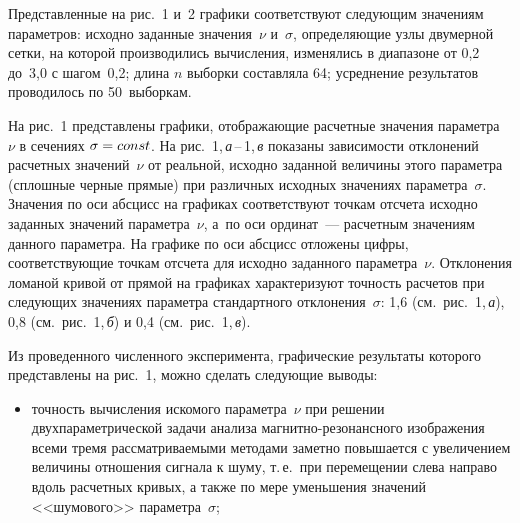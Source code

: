 \begin{multicols}{2}
    Представленные на рис.~1 и~2 графики соответствуют следующим значениям
параметров: исходно заданные значения~$\nu$ и~$\sigma$, определяющие узлы
двумерной сетки, на которой производились вычисления, изменялись в диапазоне от 0,2
до~3,0 с шагом~0,2; длина $n$ выборки составляла 64; усреднение результатов
проводилось по 50~выборкам.

    На рис.~1 представлены графики, отобра\-жа\-ющие расчетные значения
параметра~$\nu$ в сечениях $\sigma\hm=const$.
На рис.~1,\,\textit{а}\,--\,1,\,\textit{в}
показаны зависимости отклонений расчетных значений~$\nu$  от реальной, исходно
заданной величины этого параметра (сплошные черные прямые)
при различных исходных значениях
параметра~$\sigma$. Значения по оси абсцисс на\linebreak
графиках соответствуют точкам отсчета
исходно \mbox{заданных} значений параметра~$\nu$, а~по оси ординат~--- расчетным значениям
данного параметра. %
На графике
по оси абсцисс отложены цифры, соответствующие точкам отсчета для исходно заданного
параметра~$\nu$. Отклонения ломаной кривой от прямой на графиках характеризуют точность
расчетов при следующих значениях параметра стандартного отклонения~$\sigma$:
1,6 (см.\ рис.~1,\,\textit{а}), 0,8 (см.\ рис.~1,\,\textit{б})
и 0,4 (см.\ рис.~1,\,\textit{в}).

    Из проведенного численного эксперимента, графические результаты которого
представлены на рис.~1, можно сделать следующие выводы:
    \begin{itemize} %
    \item  точность вычисления искомого параметра~$\nu$ при решении
двухпараметрической задачи анализа маг\-нит\-но-ре\-зо\-нансно\-го изображения всеми
тремя рассматриваемыми методами заметно повышается с увеличением величины
отношения сигнала к шуму, т.\,е.\ при перемещении слева направо вдоль расчетных
кривых, а также по мере уменьшения значений <<шумового>> параметра~$\sigma$;
\end{itemize}


\end{multicols}

